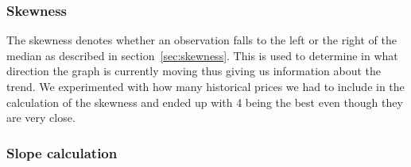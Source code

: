 \subsubsection{Skewness}
\begin{table}[H]
\centering  %
\caption{Number of historical prices to include in the skewness calculation} %
\label{table:SkewnessTest} %
\end{table}

The skewness denotes whether an observation falls to the left or the right of the median as described in section~\ref{sec:skewness}. This is used to determine in what direction the graph is currently moving thus giving us information about the trend. We experimented with how many historical prices we had to include in the calculation of the skewness and ended up with 4 being the best even though they are very close.

\subsubsection{Slope calculation}
\begin{table}[H]
\centering  %
\caption{Slope calculation stack size} %
\label{table:CurveTest} %
\end{table}

